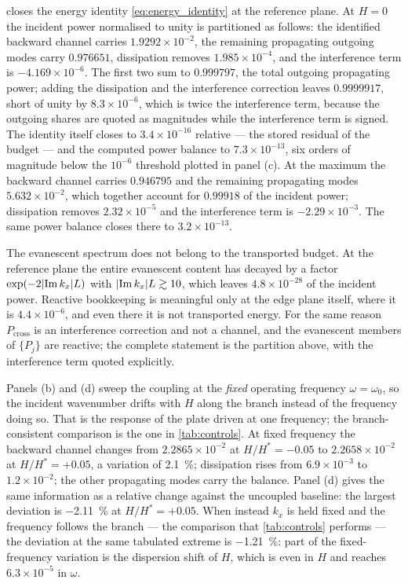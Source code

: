  closes the energy identity \eqref{eq:energy_identity} at the
reference plane.  At $H=0$ the incident power normalised to unity is partitioned
as follows: the identified backward channel carries $1.9292\times10^{-2}$, the
remaining propagating outgoing modes carry $0.976651$, dissipation removes
$1.985\times10^{-4}$, and the interference term is $-4.169\times10^{-6}$.  The
first two sum to $0.999797$, the total outgoing propagating power; adding the
dissipation and the interference correction leaves $0.9999917$, short of unity by
$8.3\times10^{-6}$, which is twice the interference term, because the outgoing
shares are quoted as magnitudes while the interference term is signed.  The
identity itself closes to $3.4\times10^{-16}$ relative --- the stored residual of
the budget --- and the computed power balance to $7.3\times10^{-13}$, six orders
of magnitude below the $10^{-6}$ threshold plotted in panel (c).  At the maximum
the backward channel carries $0.946795$ and the remaining propagating modes
$5.632\times10^{-2}$, which together account for $0.99918$ of the incident
power; dissipation removes $2.32\times10^{-5}$ and the interference term is
$-2.29\times10^{-3}$.  The same power balance closes there to
$3.2\times10^{-13}$.

The evanescent spectrum does not belong to the transported budget.  At the
reference plane the entire evanescent content has decayed by a factor
$\exp(-2|{\operatorname{Im} k_x}|L)$ with $|{\operatorname{Im} k_x}|L\gtrsim10$, which leaves
$4.8\times10^{-28}$ of the incident power.  Reactive bookkeeping is meaningful
only at the edge plane itself, where it is $4.4\times10^{-6}$, and even there it
is not transported energy.  For the same reason $P_{\text{cross}}$ is an
interference correction and not a channel, and the evanescent members of
$\{P_j\}$ are reactive; the complete statement is the partition above, with the
interference term quoted explicitly.

Panels (b) and (d) sweep the coupling at the \emph{fixed} operating frequency
$\omega=\omega_0$, so the incident wavenumber drifts with $H$ along the branch
instead of the frequency doing so.  That is the response of the plate driven at
one frequency; the branch-consistent comparison is the one in
\cref{tab:controls}.  At
fixed frequency the backward channel changes from $2.2865\times10^{-2}$ at
$H/H^{*}=-0.05$ to $2.2658\times10^{-2}$ at $H/H^{*}=+0.05$, a variation of
\SI{2.1}{\percent}; dissipation rises from $6.9\times10^{-3}$ to
$1.2\times10^{-2}$; the other propagating modes carry the balance.  Panel (d)
gives the same information as a relative change against the uncoupled baseline:
the largest deviation is \SI{-2.11}{\percent} at $H/H^{*}=+0.05$.  When instead
$k_x$ is held fixed and the frequency follows the branch --- the comparison that
\cref{tab:controls} performs --- the deviation at the same tabulated extreme is
\SI{-1.21}{\percent}: part of the fixed-frequency variation is the dispersion
shift of $H$, which is even in $H$ and reaches $6.3\times10^{-5}$ in $\omega$.

